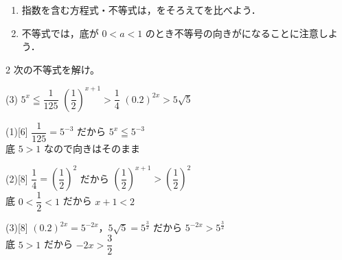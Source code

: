 \documentclass[14pt,dvipdfmx]{jsarticle}
\begin{document}
\begin{summarybox}
  \begin{enumerate}[label=\textbf{\arabic*}, leftmargin=1.5zw, itemsep=0.2em]
    \item 指数を含む方程式・不等式は，をそろえてを比べよう．
    \item 不等式では，底が $0<a<1$ のとき不等号の向きがになることに注意しよう．
  \end{enumerate}
\end{summarybox}

\begin{exerciseprob}{2}
  次の不等式を解け。
  \begin{tasks}[label=(\arabic*), label-width=1.6zw, item-indent=2zw, after-item-skip=0.15em](3)
    \task $5^x \leqq \dfrac{1}{125}$
    \task $\left(\dfrac{1}{2}\right)^{x+1} > \dfrac{1}{4}$
    \task $(0.2)^{2x} > 5\sqrt{5}$
  \end{tasks}
\end{exerciseprob}

\begin{answerbox}{(1)}[6]
  $\dfrac{1}{125}=5^{-3}$ だから $5^x\leqq 5^{-3}$ \\
  底 $5>1$ なので向きはそのまま
\end{answerbox}
\begin{answerbox}{(2)}[8]
  $\dfrac{1}{4}=\left(\dfrac{1}{2}\right)^2$ だから $\left(\dfrac{1}{2}\right)^{x+1}>\left(\dfrac{1}{2}\right)^2$ \\
  底 $0<\dfrac{1}{2}<1$ だから $x+1<2$
\end{answerbox}
\begin{answerbox}{(3)}[8]
  $(0.2)^{2x}=5^{-2x}$，$5\sqrt{5}=5^{\frac{3}{2}}$ だから $5^{-2x}>5^{\frac{3}{2}}$ \\
  底 $5>1$ だから $-2x>\dfrac{3}{2}$
\end{answerbox}

\vfill
{}
\end{document}
